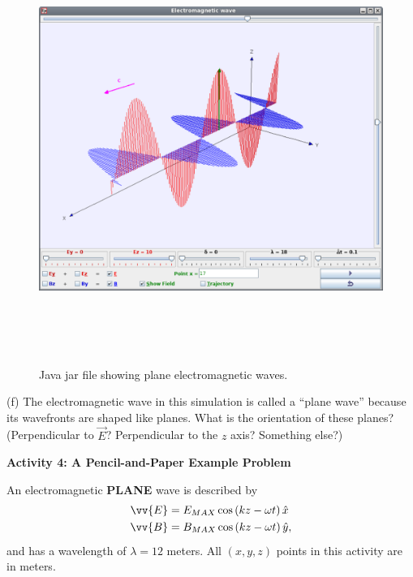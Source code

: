 \begin{figure}[h!]
\begin{center}
\includegraphics[height=5.50in]{plane_waves/planeWave1}
\caption{Java jar file showing plane electromagnetic waves.}
\end{center}
\end{figure}

(f) The electromagnetic wave in this simulation is called a ``plane wave'' because its 
wavefronts are shaped like planes.  
What is the orientation of these planes?  
(Perpendicular to $\vec {E}$?  Perpendicular to the $z$ axis? Something else?)
\answerspace{20mm}

\pagebreak[2]


\textbf{Activity 4: A Pencil-and-Paper Example Problem}

An electromagnetic \textbf{PLANE} wave is described by
\begin{align*}
\vv {E} &= E_{MAX} \cos \left ( kz - \omega t \right ) \hat x\\
\vv {B} &= B_{MAX} \cos \left ( kz - \omega t \right ) \hat y,
\end{align*}
and has a wavelength of $\lambda =12$ meters.  All $(x,y,z)$ points in this activity are in meters.

